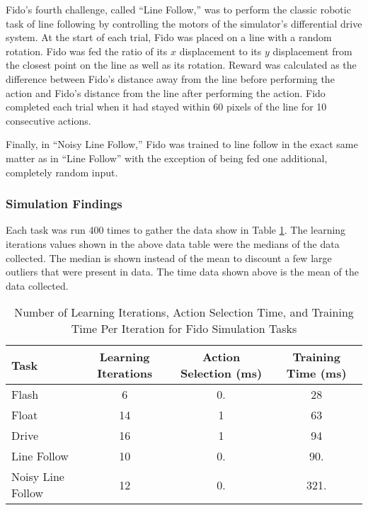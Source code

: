 Fido's fourth challenge, called ``Line Follow,'' was to perform the classic robotic task of line following by controlling the motors of the simulator's differential drive system.
At the start of each trial, Fido was placed on  a line with a random rotation.
Fido was fed the ratio of its $x$ displacement to its $y$ displacement from the closest point on the line as well as its rotation.
Reward was calculated as the difference between Fido's distance away from the line before performing the action and Fido's distance from the line after performing the action.
Fido completed each trial when it had stayed within 60 pixels of the line for 10 consecutive actions.

Finally, in ``Noisy Line Follow,'' Fido was trained to line follow in the exact same matter as in ``Line Follow'' with the exception of being fed one additional, completely random input.

\subsubsection{Simulation Findings}

Each task was run 400 times to gather the data show in Table \ref{tab:data}.
The learning iterations values shown in the above data table were the medians of the data collected.
The median is shown instead of the mean to discount a few large outliers that were present in data.
The time data shown above is the mean of the data collected.

\begin{table}[ht]
	\centering
	\begin{tabular}{@{}lccc@{}}
		\toprule
		Task        & Learning Iterations & Action Selection (ms) & Training Time (ms) \\ \midrule
		Flash       & 6                   & 0.                 & 28                    \\
		Float       & 14                  & 1                  & 63                    \\
		Drive       & 16                  & 1                  & 94                    \\
		Line Follow       & 10                  & 0.                 & 90.                    \\
		Noisy Line Follow & 12                 & 0.                 & 321.				   \\ \bottomrule
	\end{tabular}
	\caption{Number of Learning Iterations, Action Selection Time, and Training Time Per Iteration for Fido Simulation Tasks}
	\label{tab:data}
\end{table}

